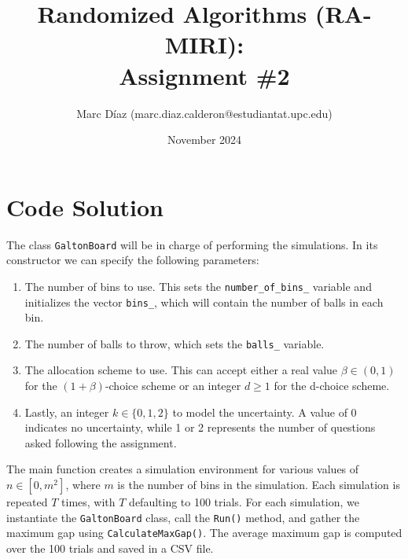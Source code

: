\documentclass[a4paper, 11pt]{article}
\title{Randomized Algorithms (RA-MIRI): \\
        Assignment \#2
        }
\author{%
    Marc Díaz (marc.diaz.calderon@estudiantat.upc.edu) 
}
\date{November 2024}
\begin{document}
\maketitle

\section{Code Solution}

The class \texttt{GaltonBoard} will be in charge of performing the simulations. In its constructor we can specify the following parameters:
\begin{enumerate}
    \item The number of bins to use. This sets the \texttt{number\_of\_bins\_} variable and initializes the vector \texttt{bins\_}, which will contain the number of balls in each bin.
    \item The number of balls to throw, which sets the \texttt{balls\_} variable.
    \item The allocation scheme to use. This can accept either a real value \( \beta \in (0,1) \) for the \( (1+\beta)\)-choice scheme or an integer \( d \geq 1 \) for the d-choice scheme.
    \item Lastly, an integer \( k \in \{0,1,2\} \) to model the uncertainty. A value of 0 indicates no uncertainty, while 1 or 2 represents the number of questions asked following the assignment.
\end{enumerate}

The main function creates a simulation environment for various values of \( n \in [0,m^2]\), where \( m \) is the number of bins in the simulation. Each simulation is repeated \( T \) times, with \( T \) defaulting to 100 trials. For each simulation, we instantiate the \texttt{GaltonBoard} class, call the \texttt{Run()} method, and gather the maximum gap using \texttt{CalculateMaxGap()}. The average maximum gap is computed over the 100 trials and saved in a CSV file.
\end{document}
